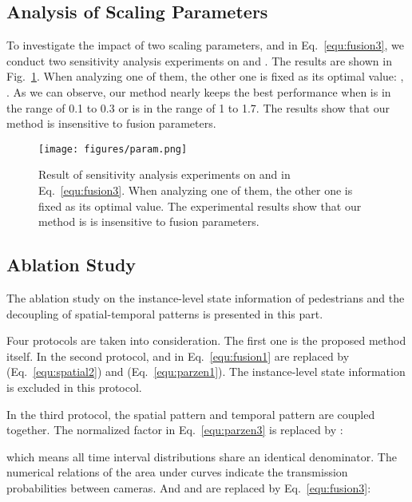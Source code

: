\documentclass[10pt,twocolumn,letterpaper]{article}
\begin{document}
\subsection{Analysis of Scaling Parameters}
\vspace{-0.15cm}
To investigate the impact of two scaling parameters,  and  in Eq.~\ref{equ:fusion3}, we conduct two sensitivity analysis experiments on  and .
The results are shown in Fig.~\ref{fig:param}.
When analyzing one of them, the other one is fixed as its optimal value: , .
As we can observe, our method nearly keeps the best performance when  is in the range of 0.1 to 0.3 or  is in the range of 1 to 1.7. The results show that our method is insensitive to fusion parameters.

\begin{figure}[t]
\begin{center}
   \texttt{[image: figures/param.png]}
\end{center}
\vspace{-0.4cm}
   \caption {Result of sensitivity analysis experiments on  and  in Eq.~\ref{equ:fusion3}. When analyzing one of them, the other one is fixed as its optimal value. The experimental results show that our method is is insensitive to fusion parameters.}
\label{fig:param}
\vspace{-0.3cm}
\end{figure}






\subsection{Ablation Study}
\vspace{-0.15cm}
The ablation study on the instance-level state information of pedestrians and the decoupling of spatial-temporal patterns is presented in this part.

Four protocols are taken into consideration.
The first one is the proposed method itself.
In the second protocol,  and  in Eq.~\ref{equ:fusion1} are replaced by  (Eq.~\ref{equ:spatial2}) and  (Eq.~\ref{equ:parzen1}). The instance-level state information is excluded in this protocol.

In the third protocol, the spatial pattern and temporal pattern are coupled together. The normalized factor in Eq.~\ref{equ:parzen3} is replaced by :


which means all time interval distributions share an identical denominator. 
The numerical relations of the area under curves indicate the transmission probabilities between cameras. 
And  and  are replaced by  Eq.~\ref{equ:fusion3}:
\end{document}
